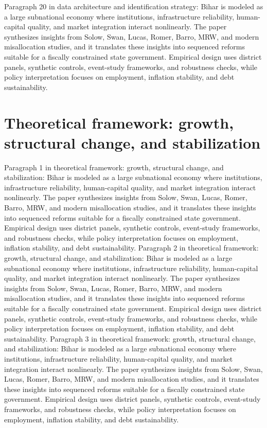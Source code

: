 \documentclass[preprint,12pt]{elsarticle}
\begin{document}
Paragraph 20 in data architecture and identification strategy: Bihar is modeled as a large subnational economy where institutions, infrastructure reliability, human-capital quality, and market integration interact nonlinearly. The paper synthesizes insights from Solow, Swan, Lucas, Romer, Barro, MRW, and modern misallocation studies, and it translates these insights into sequenced reforms suitable for a fiscally constrained state government. Empirical design uses district panels, synthetic controls, event-study frameworks, and robustness checks, while policy interpretation focuses on employment, inflation stability, and debt sustainability.
\section{Theoretical framework: growth, structural change, and stabilization}
Paragraph 1 in theoretical framework: growth, structural change, and stabilization: Bihar is modeled as a large subnational economy where institutions, infrastructure reliability, human-capital quality, and market integration interact nonlinearly. The paper synthesizes insights from Solow, Swan, Lucas, Romer, Barro, MRW, and modern misallocation studies, and it translates these insights into sequenced reforms suitable for a fiscally constrained state government. Empirical design uses district panels, synthetic controls, event-study frameworks, and robustness checks, while policy interpretation focuses on employment, inflation stability, and debt sustainability.
Paragraph 2 in theoretical framework: growth, structural change, and stabilization: Bihar is modeled as a large subnational economy where institutions, infrastructure reliability, human-capital quality, and market integration interact nonlinearly. The paper synthesizes insights from Solow, Swan, Lucas, Romer, Barro, MRW, and modern misallocation studies, and it translates these insights into sequenced reforms suitable for a fiscally constrained state government. Empirical design uses district panels, synthetic controls, event-study frameworks, and robustness checks, while policy interpretation focuses on employment, inflation stability, and debt sustainability.
Paragraph 3 in theoretical framework: growth, structural change, and stabilization: Bihar is modeled as a large subnational economy where institutions, infrastructure reliability, human-capital quality, and market integration interact nonlinearly. The paper synthesizes insights from Solow, Swan, Lucas, Romer, Barro, MRW, and modern misallocation studies, and it translates these insights into sequenced reforms suitable for a fiscally constrained state government. Empirical design uses district panels, synthetic controls, event-study frameworks, and robustness checks, while policy interpretation focuses on employment, inflation stability, and debt sustainability.
\end{document}
